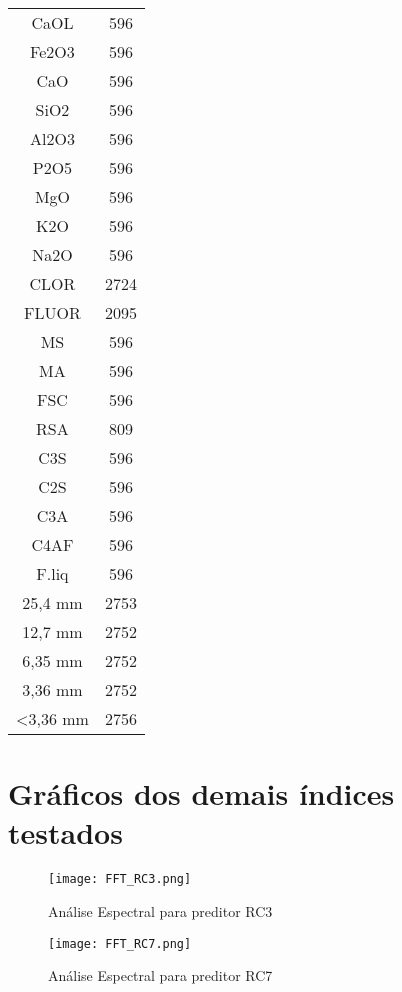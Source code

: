 \newpage
{}
\begin{center}
\begin{tabular}{ c c }
 CaOL       &      596\\
Fe2O3       &    596\\
CaO         &   596\\
SiO2        &  596\\
Al2O3       & 596\\
P2O5        & 596\\
MgO         & 596\\
K2O         & 596\\
Na2O        & 596\\
CLOR        & 2724\\
FLUOR       & 2095\\
MS          & 596\\
MA          & 596\\
FSC         & 596\\
RSA         & 809\\
C3S         & 596\\
C2S         & 596\\
C3A         & 596\\
C4AF        & 596\\
F.liq       & 596\\
25,4 mm     & 2753\\
12,7 mm     & 2752\\
6,35  mm    & 2752\\
3,36 mm     & 2752\\
\textless 3,36 mm    & 2756
\end{tabular}
\end{center}

\chapter{Gráficos dos demais índices testados}
\label{ape:graphs}


\begin{figure}[H]
\centering
\texttt{[image: FFT\_RC3.png]}
\caption{Análise Espectral para preditor RC3}
\end{figure}

\begin{figure}[H]
\centering
\texttt{[image: FFT\_RC7.png]}
\caption{Análise Espectral para preditor RC7}
\end{figure}
